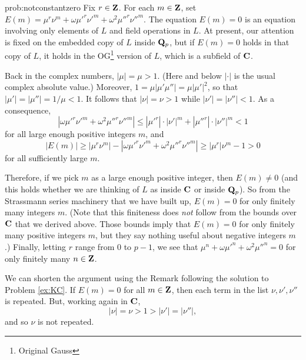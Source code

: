 \begin{sol}{prob:notconstantzero} Fix $r \in \mathbf{Z}$. For each $m\in \mathbf{Z}$, set $E(m) = \mu^r \nu^m + \omega \mu'^r \nu'^m + \omega^2 \mu''^r \nu''^m$. The equation $E(m)=0$ is an equation involving only elements of $L$ and field operations in $L$. At present, our attention is fixed on the embedded copy of $L$ inside $\mathbf{Q}_p$, but if $E(m)=0$ holds in that copy of $L$, it holds in the OG\footnote{Original Gauss} version of $L$, which is a subfield of $\mathbf{C}$.  

Back in the complex numbers, $|\mu| = \mu > 1$. (Here and below $|\cdot|$ is the usual complex absolute value.) Moreover, $1 = \mu|\mu'\mu''| = \mu |\mu'|^2$, so that $|\mu'| = |\mu''| = 1/\mu < 1$. It follows that $|\nu| = \nu >1$ while $|\nu'| = |\nu''| < 1$. As a consequence, 
\[ |\omega \mu'^r \nu'^m + \omega^2 \mu''^r \nu''^m| \le |\mu'^r|\cdot |\nu'|^m + |\mu''^r| \cdot |\nu''|^m < 1\]
for all large enough positive integers $m$, and
\[ |E(m)| \ge |\mu^r \nu^m| - |\omega \mu'^r \nu'^m + \omega^2 \mu''^r \nu''^m| \ge |\mu^r| \nu^m - 1 > 0 \]
for all sufficiently large $m$.

Therefore, if we pick $m$ as a large enough positive integer, then $E(m)\ne 0$ (and this holds whether we are thinking of $L$ as inside $\mathbf{C}$ or inside $\mathbf{Q}_p$). So from the Strassmann series machinery that we have built up, $E(m)=0$ for only finitely many integers $m$. (Note that this finiteness does \emph{not} follow from the bounds over $\mathbf{C}$ that we derived above. Those bounds imply that $E(m)=0$ for only finitely many positive integers $m$, but they say nothing useful about negative integers $m$.) Finally, letting $r$ range from $0$ to $p-1$, we see that $\mu^n + \omega \mu'^n + \omega^2 \mu''^n=0$ for only finitely many $n\in \mathbf{Z}$.
\end{sol}


\begin{rmk} We can shorten the argument using the Remark following the solution to Problem \ref{ex:KC}. If $E(m)=0$ for all $m \in \mathbf{Z}$, then each term in the list $\nu, \nu', \nu''$ is repeated. But, working again in $\mathbf{C}$,
\[ |\nu| = \nu > 1 > |\nu'| = |\nu''|,\] and so $\nu$ is not repeated.
\end{rmk}

